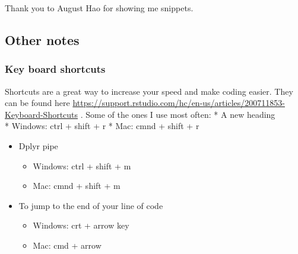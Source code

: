 \documentclass[
]{article}
\providecommand{\tightlist}{%
  \setlength{\itemsep}{0pt}\setlength{\parskip}{0pt}}
\begin{document}
Thank you to August Hao for showing me snippets.

\hypertarget{other-notes}{%
\subsection{Other notes}\label{other-notes}}

\hypertarget{key-board-shortcuts}{%
\subsubsection{Key board shortcuts}\label{key-board-shortcuts}}

Shortcuts are a great way to increase your speed and make coding easier.
They can be found here
\url{https://support.rstudio.com/hc/en-us/articles/200711853-Keyboard-Shortcuts}
. Some of the ones I use most often: * A new heading\\
* Windows: ctrl + shift + r * Mac: cmnd + shift + r

\begin{itemize}
\tightlist
\item
  Dplyr pipe

  \begin{itemize}
  \tightlist
  \item
    Windows: ctrl + shift + m
  \item
    Mac: cmnd + shift + m
  \end{itemize}
\item
  To jump to the end of your line of code

  \begin{itemize}
  \tightlist
  \item
    Windows: crt + arrow key
  \item
    Mac: cmd + arrow
  \end{itemize}
\end{itemize}
\end{document}
